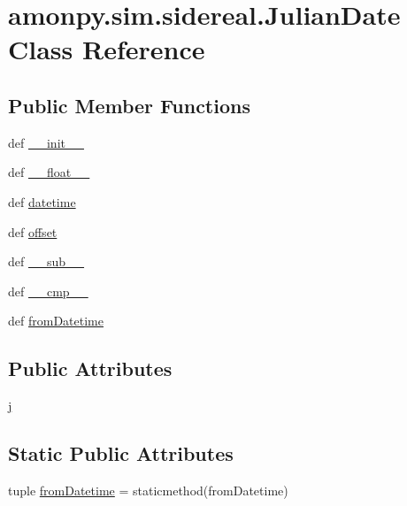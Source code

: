 \hypertarget{classamonpy_1_1sim_1_1sidereal_1_1_julian_date}{\section{amonpy.\-sim.\-sidereal.\-Julian\-Date Class Reference}
\label{classamonpy_1_1sim_1_1sidereal_1_1_julian_date}
}
\subsection*{Public Member Functions}
\begin{DoxyCompactItemize}
\item 
def \hyperlink{classamonpy_1_1sim_1_1sidereal_1_1_julian_date_a42bb061a437c389757406b5632a7920b}{\-\_\-\-\_\-init\-\_\-\-\_\-}
\item 
def \hyperlink{classamonpy_1_1sim_1_1sidereal_1_1_julian_date_aba8af23ad66585e69145709f37a23843}{\-\_\-\-\_\-float\-\_\-\-\_\-}
\item 
def \hyperlink{classamonpy_1_1sim_1_1sidereal_1_1_julian_date_a220c81239eae780c964b4d0e9342c845}{datetime}
\item 
def \hyperlink{classamonpy_1_1sim_1_1sidereal_1_1_julian_date_a936fa5050537dc5a8323f71defde47a7}{offset}
\item 
def \hyperlink{classamonpy_1_1sim_1_1sidereal_1_1_julian_date_ac0d628c2c95e6460d695add7b666836c}{\-\_\-\-\_\-sub\-\_\-\-\_\-}
\item 
def \hyperlink{classamonpy_1_1sim_1_1sidereal_1_1_julian_date_a52a4ecfeb0caa274c63019095760f359}{\-\_\-\-\_\-cmp\-\_\-\-\_\-}
\item 
def \hyperlink{classamonpy_1_1sim_1_1sidereal_1_1_julian_date_a33a4f7415139fad336ce8fd99265ea97}{from\-Datetime}
\end{DoxyCompactItemize}
\subsection*{Public Attributes}
\begin{DoxyCompactItemize}
\item 
\hyperlink{classamonpy_1_1sim_1_1sidereal_1_1_julian_date_a56dfdde7574637024c33565e181e1cc9}{j}
\end{DoxyCompactItemize}
\subsection*{Static Public Attributes}
\begin{DoxyCompactItemize}
\item 
tuple \hyperlink{classamonpy_1_1sim_1_1sidereal_1_1_julian_date_a8158160571041fe0def786c0ba7908c5}{from\-Datetime} = staticmethod(from\-Datetime)
\end{DoxyCompactItemize}


